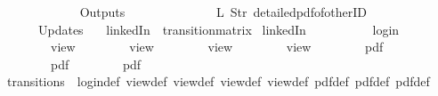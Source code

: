 \begin{isabellebody}
\ \ \ \ \ \ {\isacharbrackright}{\isacharcomma}\isanewline
\ \ \ \ \ \ Outputs\ {\isacharequal}\ {\isacharbrackleft}\isanewline
\ \ \ \ \ \ \ \ \ \ \ \ {\isacharparenleft}L\ {\isacharparenleft}Str\ {\isacharprime}{\isacharprime}detailed{\isacharunderscore}pdf{\isacharunderscore}of{\isacharunderscore}otherID{\isacharprime}{\isacharprime}{\isacharparenright}{\isacharparenright}\isanewline
\ \ \ \ \ \ {\isacharbrackright}{\isacharcomma}\isanewline
\ \ \ \ \ \ Updates\ {\isacharequal}\ {\isacharbrackleft}{\isacharbrackright}\isanewline
{\isasymrparr}{\isachardoublequoteclose}\isanewline
\isanewline
{}\isamarkupfalse%
\ {\isachardoublequoteopen}linkedIn{\isachardoublequoteclose}\ {\isacharcolon}{\isacharcolon}\ {\isachardoublequoteopen}transition{\isacharunderscore}matrix{\isachardoublequoteclose}\ \isanewline
{\isachardoublequoteopen}linkedIn\ {\isasymequiv}\ {\isacharbraceleft}{\isacharbar}\isanewline
\ \ \ \ \ \ {\isacharparenleft}{\isacharparenleft}{}{\isacharcomma}\ {}{\isacharparenright}{\isacharcomma}\ login{\isacharparenright}{\isacharcomma}\isanewline
\ \ \ \ \ \ {\isacharparenleft}{\isacharparenleft}{}{\isacharcomma}\ {}{\isacharparenright}{\isacharcomma}\ view{\isacharparenright}{\isacharcomma}\isanewline
\ \ \ \ \ \ {\isacharparenleft}{\isacharparenleft}{}{\isacharcomma}\ {}{\isacharparenright}{\isacharcomma}\ view{}{\isacharparenright}{\isacharcomma}\isanewline
\ \ \ \ \ \ {\isacharparenleft}{\isacharparenleft}{}{\isacharcomma}\ {}{\isacharparenright}{\isacharcomma}\ view{}{\isacharparenright}{\isacharcomma}\isanewline
\ \ \ \ \ \ {\isacharparenleft}{\isacharparenleft}{}{\isacharcomma}\ {}{\isacharparenright}{\isacharcomma}\ view{}{\isacharparenright}{\isacharcomma}\isanewline
\ \ \ \ \ \ {\isacharparenleft}{\isacharparenleft}{}{\isacharcomma}\ {}{\isacharparenright}{\isacharcomma}\ pdf{\isacharparenright}{\isacharcomma}\isanewline
\ \ \ \ \ \ {\isacharparenleft}{\isacharparenleft}{}{\isacharcomma}\ {}{\isacharparenright}{\isacharcomma}\ pdf{}{\isacharparenright}{\isacharcomma}\isanewline
\ \ \ \ \ \ {\isacharparenleft}{\isacharparenleft}{}{\isacharcomma}\ {}{\isacharparenright}{\isacharcomma}\ pdf{}{\isacharparenright}\isanewline
{\isacharbar}{\isacharbraceright}{\isachardoublequoteclose}\isanewline
\isanewline
{}\isamarkupfalse%
\ transitions\ {\isacharequal}\ login{\isacharunderscore}def\ view{\isacharunderscore}def\ view{}{\isacharunderscore}def\ view{}{\isacharunderscore}def\ view{}{\isacharunderscore}def\ pdf{\isacharunderscore}def\ pdf{}{\isacharunderscore}def\ pdf{}{\isacharunderscore}def\isanewline

\end{isabellebody}

